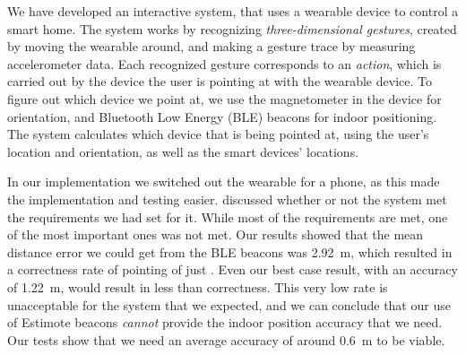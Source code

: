 We have developed an interactive system, 
that uses a wearable device to control a smart home. 
The system works by recognizing \emph{three-dimensional gestures}, 
created by moving the wearable around, 
and making a gesture trace by measuring accelerometer data. 
Each recognized gesture corresponds to an \emph{action}, 
which is carried out by the device the user is pointing at with the wearable device. 
To figure out which device we point at, 
we use the magnetometer in the device for orientation, 
and Bluetooth Low Energy (BLE) beacons for indoor positioning. 
The system calculates which device that is being pointed at, 
using the user's location and orientation, 
as well as the smart devices' locations.

In our implementation we switched out the wearable for a phone, 
as this made the implementation and testing easier. 
 discussed whether or not the system met the requirements we had set for it. 
While most of the requirements are met, 
one of the most important ones was not met. 
Our results showed that the mean distance error we could get from the BLE beacons was \SI{2.92}{\meter},
which resulted in a correctness rate of pointing of just . 
Even our best case result, with an accuracy of \SI{1.22}{\meter},
would result in less than  correctness.
This very low rate is unacceptable for the system that we expected, 
and we can conclude that our use of Estimote beacons \emph{cannot} provide the indoor position accuracy that we need. 
Our tests show that we need an average accuracy of around \SI{0.6}{\meter} to be viable. 
